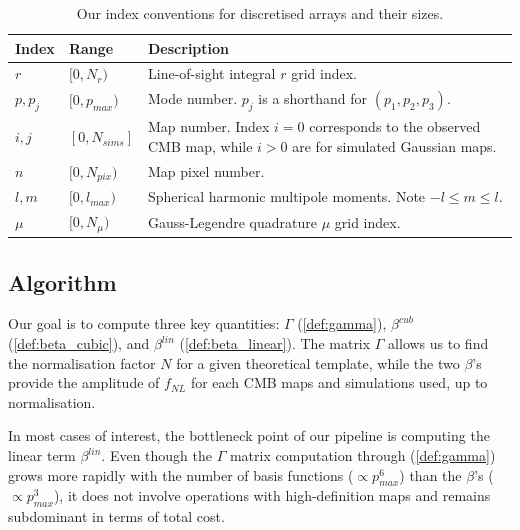 \begin{table}[htbp]
	\caption{Our index conventions for discretised arrays and their sizes.}
	\centering
	\label{table:index_conventions}
	\renewcommand{\arraystretch}{1.5} 
	\begin{tabular}{m{}  m{}  m{}} \toprule
		Index & Range & Description \\
		
		\midrule
		$r$ & $[0, N_r)$ & Line-of-sight integral $r$ grid index. \\
		
		$p, p_j$ & $[0, p_{max})$ & Mode number. $p_j$ is a shorthand for $(p_1, p_2, p_3)$. \\
		
		$i,j$ & $[0, N_{sims}]$ & Map number. Index $i=0$ corresponds to the observed CMB map, while $i>0$ are for simulated Gaussian maps. \\			
		
		$n$ & $[0, N_{pix})$ & Map pixel number. \\ 
		
		$l,m$ & $[0, l_{max})$ & Spherical harmonic multipole moments. Note $-l \le m \le l$. \\
		
		$\mu$ & $[0, N_\mu)$ & Gauss-Legendre quadrature $\mu$ grid index. \\
		
		\bottomrule
	\end{tabular}
\end{table}

\subsection{Algorithm}

Our goal is to compute three key quantities: $\Gamma$ (\ref{def:gamma}), $\beta^{cub}$ (\ref{def:beta_cubic}), and $\beta^{lin}$ (\ref{def:beta_linear}). The matrix $\Gamma$ allows us to find the normalisation factor $N$ for a given theoretical template, while the two $\beta$'s provide the amplitude of $f_{NL}$ for each CMB maps and simulations used, up to normalisation.

In most cases of interest, the bottleneck point of our pipeline is computing the linear term $\beta^{lin}$. Even though the $\Gamma$ matrix computation through (\ref{def:gamma}) grows more rapidly with the number of basis functions ($\propto p_{max}^6$) than the $\beta$'s ($\propto p_{max}^3$), it does not involve operations with high-definition maps and remains subdominant in terms of total cost.

